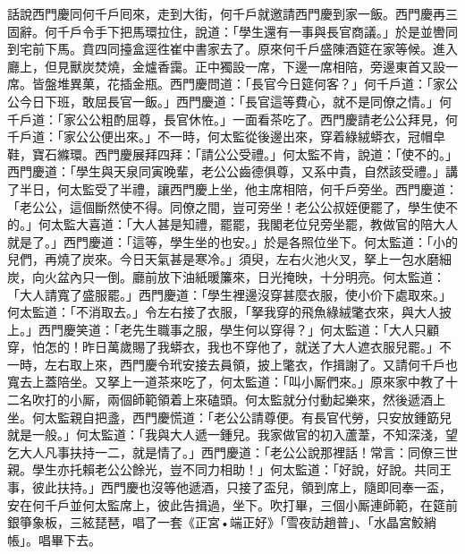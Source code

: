 話說西門慶同何千戶囘來，走到大街，何千戶就邀請西門慶到家一飯。西門慶再三固辭。何千戶令手下把馬環拉住，說道：「學生還有一事與長官商議。」於是並轡同到宅前下馬。賁四同擡盒逕徃崔中書家去了。原來何千戶盛陳酒筵在家等候。進入廳上，但見獸炭焚燒，金爐香靄。正中獨設一席，下邊一席相陪，旁邊東首又設一席。皆盤堆異菓，花插金瓶。西門慶問道：「長官今日筵何客？」何千戶道：「家公公今日下班，敢屈長官一飯。」西門慶道：「長官這等費心，就不是同僚之情。」何千戶道：「家公公粗酌屈尊，長官休恠。」一面看茶吃了。西門慶請老公公拜見，何千戶道：「家公公便出來。」不一時，何太監從後邊出來，穿着綠絨蟒衣，冠帽皁鞋，寶石縧環。西門慶展拜四拜：「請公公受禮。」何太監不肯，說道：「使不的。」{}西門慶道：「學生與天泉同寅晚輩，老公公齒德俱尊，又系中貴，自然該受禮。」講了半日，何太監受了半禮，讓西門慶上坐，他主席相陪，何千戶旁坐。西門慶道：「老公公，這個斷然使不得。同僚之間，豈可旁坐！老公公叔姪便罷了，學生使不的。」何太監大喜道：「大人甚是知禮，{}罷罷，我閣老位兒旁坐罷，教做官的陪大人就是了。」西門慶道：「這等，學生坐的也安。」於是各照位坐下。何太監道：「小的兒們，{}再燒了炭來。今日天氣甚是寒冷。」須臾，左右火池火叉，拏上一包水磨細炭，向火盆內只一倒。廳前放下油紙暖簾來，日光掩映，十分明亮。何太監道：「大人請寬了盛服罷。」西門慶道：「學生裡邊沒穿甚麼衣服，使小价下處取來。」何太監道：「不消取去。」令左右接了衣服，「拏我穿的飛魚綠絨氅衣來，與大人披上。」西門慶笑道：「老先生職事之服，學生何以穿得？」{}何太監道：「大人只顧穿，怕怎的！昨日萬歲賜了我蟒衣，我也不穿他了，就送了大人遮衣服兒罷。」不一時，左右取上來，西門慶令玳安接去員領，披上氅衣，作揖謝了。又請何千戶也寬去上蓋陪坐。又拏上一道茶來吃了，何太監道：「叫小厮們來。」{}{}原來家中教了十二名吹打的小厮，兩個師範領着上來磕頭。何太監就分付動起樂來，然後遞酒上坐。何太監親自把盞，西門慶慌道：「老公公請尊便。有長官代勞，只安放鍾筯兒就是一般。」何太監道：「我與大人遞一鍾兒。我家做官的初入蘆葦，不知深淺，望乞大人凡事扶持一二，就是情了。」{}西門慶道：「老公公說那裡話！常言：同僚三世親。學生亦托賴老公公餘光，豈不同力相助！」{}何太監道：「好說，好說。共同王事，彼此扶持。」西門慶也沒等他遞酒，只接了盃兒，領到席上，隨即囘奉一盃，安在何千戶並何太監席上，彼此告揖過，坐下。吹打畢，三個小厮連師範，在筵前銀箏象板，三絃琵琶，唱了一套《正宮•端正好》「雪夜訪趙普」、「水晶宮鮫綃帳」。唱畢下去。

